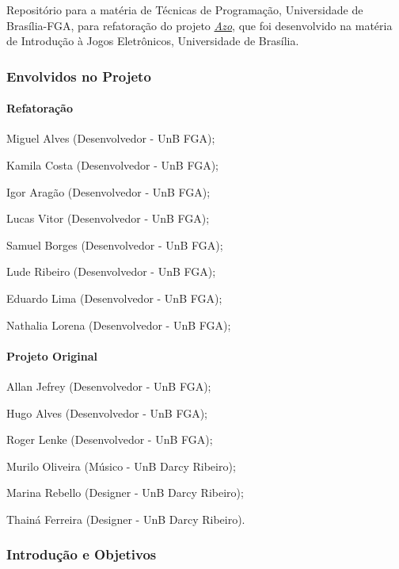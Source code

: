 Repositório para a matéria de Técnicas de Programação, Universidade de Brasília-\/\+F\+GA, para refatoração do projeto {\itshape \hyperlink{namespace_azo}{Azo}}, que foi desenvolvido na matéria de Introdução à Jogos Eletrônicos, Universidade de Brasília.

\subsubsection*{Envolvidos no Projeto}

\paragraph*{Refatoração}


\begin{DoxyItemize}
\item Miguel Alves (Desenvolvedor -\/ UnB F\+GA);
\item Kamila Costa (Desenvolvedor -\/ UnB F\+GA);
\item Igor Aragão (Desenvolvedor -\/ UnB F\+GA);
\item Lucas Vitor (Desenvolvedor -\/ UnB F\+GA);
\item Samuel Borges (Desenvolvedor -\/ UnB F\+GA);
\item Lude Ribeiro (Desenvolvedor -\/ UnB F\+GA);
\item Eduardo Lima (Desenvolvedor -\/ UnB F\+GA);
\item Nathalia Lorena (Desenvolvedor -\/ UnB F\+GA);
\end{DoxyItemize}

\paragraph*{Projeto Original}


\begin{DoxyItemize}
\item Allan Jefrey (Desenvolvedor -\/ UnB F\+GA);
\item Hugo Alves (Desenvolvedor -\/ UnB F\+GA);
\item Roger Lenke (Desenvolvedor -\/ UnB F\+GA);
\item Murilo Oliveira (Músico -\/ UnB Darcy Ribeiro);
\item Marina Rebello (Designer -\/ UnB Darcy Ribeiro);
\item Thainá Ferreira (Designer -\/ UnB Darcy Ribeiro).
\end{DoxyItemize}

\subsubsection*{Introdução e Objetivos}

